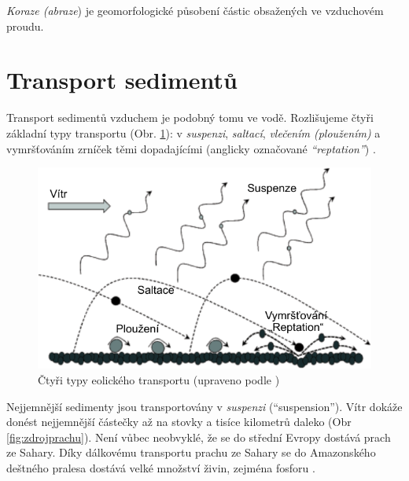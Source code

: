 \emph{Koraze (abraze}) je geomorfologické působení částic obsažených ve vzduchovém proudu.

\section{Transport sedimentů}
Transport sedimentů vzduchem je podobný tomu ve vodě. Rozlišujeme čtyři základní typy transportu (Obr. \ref{fig:eoltransport}): v \emph{suspenzi}, \emph{saltací}, \emph{vlečením (ploužením)} a vymršťováním zrníček těmi dopadajícími (anglicky označované \emph{\enquote{reptation}}) \parencite{livingstoneAeolianGeomorphologyNew2019}. 

\begin{figure}
	\centering
	\includegraphics[width=1\linewidth]{obrazky/eolicka/eol_transport}
	\caption{Čtyři typy eolického transportu (upraveno podle \textcite{livingstoneAeolianGeomorphologyNew2019})}
	\label{fig:eoltransport}
\end{figure}


Nejjemnější sedimenty jsou transportovány v \emph{suspenzi} (\enquote{suspension}). Vítr dokáže donést nejjemnější částečky až na stovky a tisíce kilometrů daleko (Obr \ref{fig:zdrojprachu}). Není vůbec neobvyklé, že se do střední Evropy dostává prach ze Sahary. Díky dálkovému transportu prachu ze Sahary se do Amazonského deštného pralesa dostává velké množství živin, zejména fosforu \parencite{prosperoCharacterizingQuantifyingAfrican2020}.

